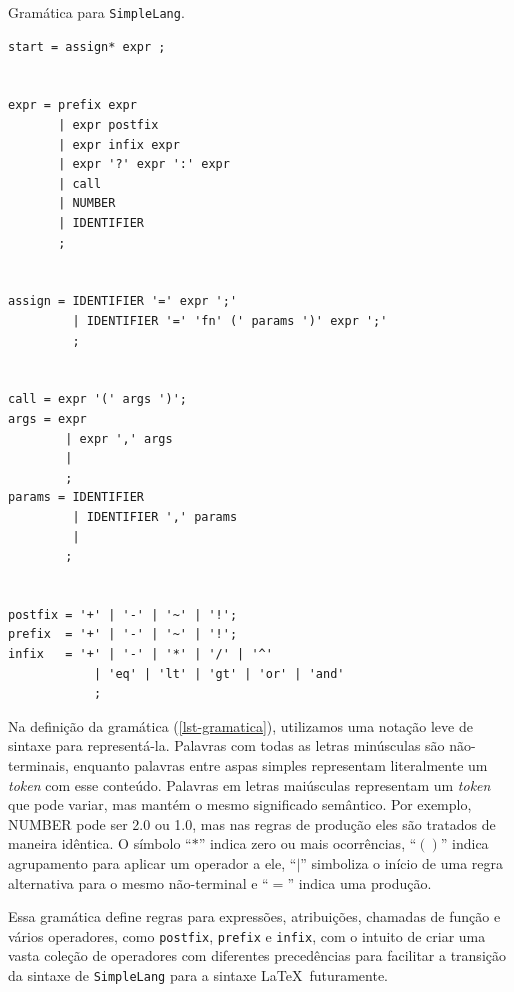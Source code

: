 \begin{codigo}[H]
        \caption{\small Gramática para \texttt{SimpleLang}.}
        \label{lst-gramatica}
\begin{lstlisting}[numbers=none, frame=none]
start = assign* expr ;


expr = prefix expr 
       | expr postfix  
       | expr infix expr 
       | expr '?' expr ':' expr
       | call
       | NUMBER
       | IDENTIFIER
       ;


assign = IDENTIFIER '=' expr ';'
         | IDENTIFIER '=' 'fn' (' params ')' expr ';'
         ; 


call = expr '(' args ')';
args = expr
        | expr ',' args
        | 
        ;
params = IDENTIFIER
         | IDENTIFIER ',' params
         | 
        ;


postfix = '+' | '-' | '~' | '!';
prefix  = '+' | '-' | '~' | '!';
infix   = '+' | '-' | '*' | '/' | '^'
            | 'eq' | 'lt' | 'gt' | 'or' | 'and'
            ;
\end{lstlisting}
\end{codigo}


  Na definição da gramática (\autoref{lst-gramatica}), utilizamos uma notação leve de sintaxe para representá-la. Palavras com todas as letras minúsculas são não-terminais, enquanto palavras entre aspas simples representam literalmente um \textit{token} com esse conteúdo. Palavras em letras maiúsculas representam um \textit{token} que pode variar, mas mantém o mesmo significado semântico. Por exemplo, NUMBER pode ser 2.0 ou 1.0, mas nas regras de produção eles são tratados de maneira idêntica. O símbolo ``$*$'' indica zero ou mais ocorrências, ``$()$'' indica agrupamento para aplicar um operador a ele, ``$|$'' simboliza o início de uma regra alternativa para o mesmo não-terminal e ``$=$'' indica uma produção.





Essa gramática define regras para expressões, atribuições, chamadas de função e vários operadores, como \texttt{postfix}, \texttt{prefix} e \texttt{infix}, com o intuito de criar uma vasta coleção de operadores com diferentes precedências para facilitar a transição da sintaxe de \texttt{SimpleLang} para a sintaxe \LaTeX\  futuramente.






